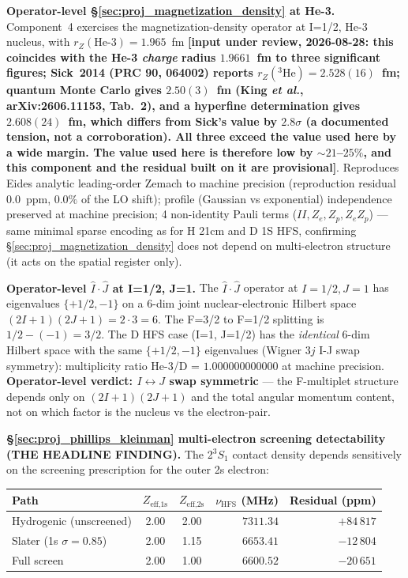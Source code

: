 \documentclass[11pt]{article}
\begin{document}
\textbf{Operator-level \S\ref{sec:proj_magnetization_density} at He-3.}
Component~4 exercises the magnetization-density operator at I=1/2,
He-3 nucleus, with $r_Z(\text{He-3}) = 1.965$~fm \textbf{[input under
review, 2026-08-28: this coincides with the He-3 \emph{charge} radius
$1.9661$~fm to three significant figures; Sick~2014 (PRC \textbf{90},
064002) reports $r_Z({}^3\text{He}) = 2.528(16)$~fm; quantum Monte Carlo
gives $2.50(3)$~fm (King \emph{et al.}, arXiv:2606.11153, Tab.~2), and a hyperfine determination gives $2.608(24)$~fm,
which differs from Sick's value by $2.8\sigma$ (a documented tension, not
a corroboration).  All three exceed the value used here by a wide margin.  The value
used here is therefore low by $\sim\!21$--$25\%$, and this component and
the residual built on it are provisional]}.
Reproduces Eides analytic leading-order Zemach to machine precision
(reproduction residual $0.0$~ppm, $0.0\%$ of the LO shift); profile
(Gaussian vs exponential) independence preserved at machine precision;
4 non-identity Pauli terms ($II, Z_e, Z_p, Z_e Z_p$) --- same minimal
sparse encoding as for H 21cm and D 1S HFS, confirming
\S\ref{sec:proj_magnetization_density} does not depend on multi-electron
structure (it acts on the spatial register only).

\textbf{Operator-level $\hat{I}\!\cdot\!\hat{J}$ at I=1/2, J=1.} The
$\hat{I}\!\cdot\!\hat{J}$ operator at $I=1/2, J=1$ has eigenvalues
$\{+1/2, -1\}$ on a 6-dim joint nuclear-electronic Hilbert space
$(2I+1)(2J+1) = 2 \cdot 3 = 6$. The F=3/2 to F=1/2 splitting is
$1/2 - (-1) = 3/2$. The D HFS case (I=1, J=1/2) has the
\emph{identical} 6-dim Hilbert space with the same $\{+1/2, -1\}$
eigenvalues (Wigner $3j$ I-J swap symmetry): multiplicity ratio
He-3/D = $1.000000000000$ at machine precision.
\textbf{Operator-level verdict: $I\leftrightarrow J$ swap symmetric}
--- the F-multiplet structure depends only on $(2I+1)(2J+1)$ and the
total angular momentum content, not on which factor is the nucleus
vs the electron-pair.

\textbf{\S\ref{sec:proj_phillips_kleinman} multi-electron screening
detectability (THE HEADLINE FINDING).} The 2$^3\!S_1$ contact density
depends sensitively on the screening prescription for the outer 2s
electron:

\begin{center}\small
\begin{tabular}{l c c r r}
\toprule
Path & $Z_\text{eff,1s}$ & $Z_\text{eff,2s}$ & $\nu_\text{HFS}$ (MHz) &
Residual (ppm) \\
\midrule
Hydrogenic (unscreened) & 2.00 & 2.00 & $7311.34$ & $+84\,817$ \\
Slater (1s $\sigma=0.85$) & 2.00 & 1.15 & $6653.41$ & $-12\,804$ \\
Full screen & 2.00 & 1.00 & $6600.52$ & $-20\,651$ \\
\bottomrule
\end{tabular}
\end{center}
\end{document}

